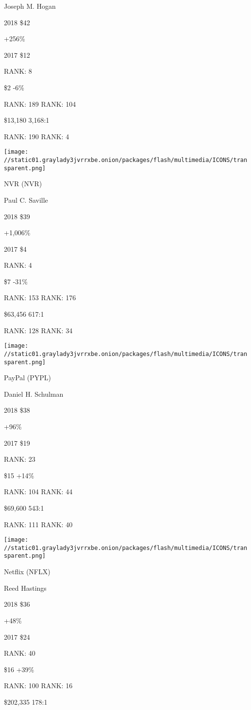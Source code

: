 Joseph M. Hogan \protect\hyperlink{g-footnotes}{}

2018 \$42

 +256\%

2017 \$12

RANK: 8

 \$2 -6\%

RANK: 189 RANK: 104

 \$13,180 3,168:1

RANK: 190 RANK: 4

\texttt{[image: //static01.graylady3jvrrxbe.onion/packages/flash/multimedia/ICONS/transparent.png]}

NVR (NVR)

Paul C. Saville \protect\hyperlink{g-footnotes}{}

2018 \$39

 +1,006\%

2017 \$4

RANK: 4

 \$7 -31\%

RANK: 153 RANK: 176

 \$63,456 617:1

RANK: 128 RANK: 34

\texttt{[image: //static01.graylady3jvrrxbe.onion/packages/flash/multimedia/ICONS/transparent.png]}

PayPal (PYPL)

Daniel H. Schulman \protect\hyperlink{g-footnotes}{}

2018 \$38

 +96\%

2017 \$19

RANK: 23

 \$15 +14\%

RANK: 104 RANK: 44

 \$69,600 543:1

RANK: 111 RANK: 40

\texttt{[image: //static01.graylady3jvrrxbe.onion/packages/flash/multimedia/ICONS/transparent.png]}

Netflix (NFLX)

Reed Hastings \protect\hyperlink{g-footnotes}{}

2018 \$36

 +48\%

2017 \$24

RANK: 40

 \$16 +39\%

RANK: 100 RANK: 16

 \$202,335 178:1

